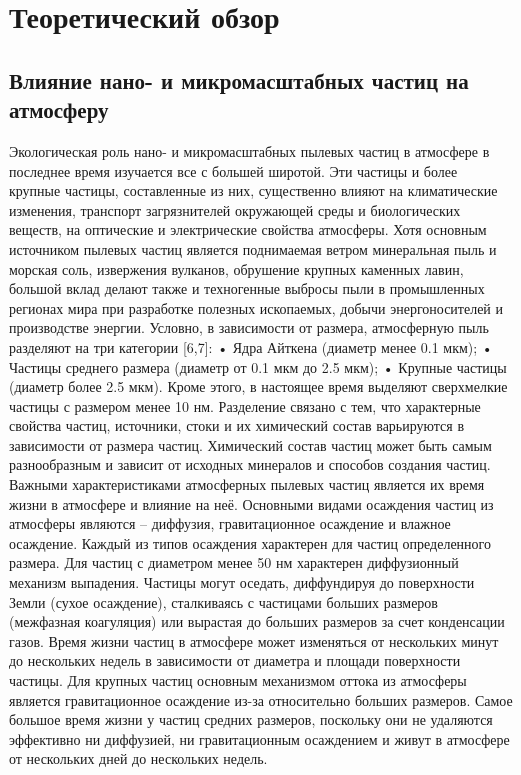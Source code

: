 \chapter{Теоретический обзор} \label{chapt11}

\section{Влияние нано- и микромасштабных частиц на атмосферу} \label{sect1_1}

Экологическая роль нано- и микромасштабных пылевых частиц в атмосфере в последнее время изучается все с большей широтой. Эти частицы и более крупные частицы, составленные из них, существенно влияют на климатические изменения, транспорт загрязнителей окружающей среды и биологических веществ, на оптические и электрические свойства атмосферы. 
Хотя основным источником пылевых частиц является поднимаемая ветром минеральная пыль и морская соль, извержения вулканов, обрушение крупных каменных лавин, большой вклад делают также и техногенные выбросы пыли в промышленных регионах мира при разработке полезных ископаемых, добычи энергоносителей и производстве энергии.
Условно, в зависимости от размера, атмосферную пыль разделяют на три категории [6,7]:
•	Ядра Айткена (диаметр менее 0.1 мкм);
•	Частицы среднего размера (диаметр от 0.1 мкм до 2.5 мкм);
•	Крупные частицы (диаметр более 2.5 мкм).
Кроме этого, в настоящее время выделяют сверхмелкие частицы с размером менее 10 нм.
Разделение связано с тем, что характерные свойства частиц, источники, стоки и их химический состав варьируются в зависимости от размера частиц.
Химический состав частиц может быть самым разнообразным и зависит от исходных минералов и способов создания частиц.
Важными характеристиками атмосферных пылевых частиц является их время жизни в атмосфере и влияние на неё. 
Основными видами осаждения частиц из атмосферы являются – диффузия, гравитационное осаждение и влажное осаждение. Каждый из типов осаждения характерен для частиц определенного размера. Для частиц с диаметром менее 50 нм характерен диффузионный механизм выпадения. Частицы могут оседать, диффундируя до поверхности Земли (сухое осаждение), сталкиваясь с частицами больших размеров (межфазная коагуляция) или вырастая до больших размеров за счет конденсации газов. 
Время жизни частиц в атмосфере может изменяться от нескольких минут до нескольких недель в зависимости от диаметра и площади поверхности частицы. Для крупных частиц основным механизмом оттока из атмосферы является гравитационное осаждение из-за относительно больших размеров. Самое большое время жизни у частиц средних размеров, поскольку они не удаляются эффективно ни диффузией, ни гравитационным осаждением и живут в атмосфере от нескольких дней до нескольких недель.

